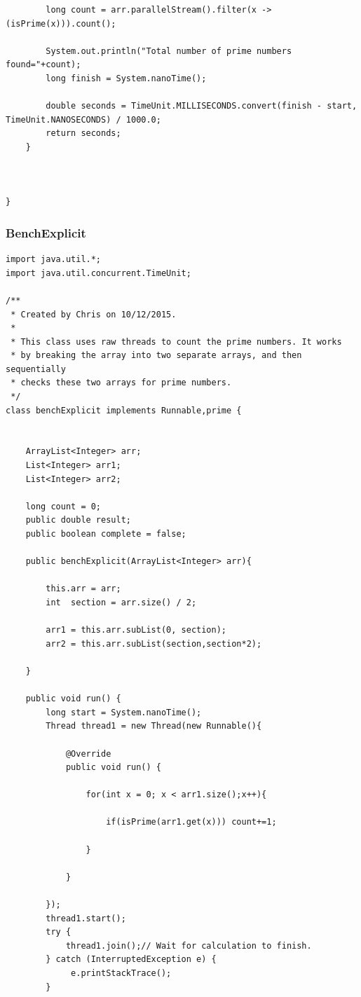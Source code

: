 \documentclass[10pt]{article}  %
\theoremstyle{definition}
\theoremstyle{remark}
\begin{document}
\begin{appendices}
\begin{lstlisting}
        long count = arr.parallelStream().filter(x -> (isPrime(x))).count();

        System.out.println("Total number of prime numbers found="+count);
        long finish = System.nanoTime();

        double seconds = TimeUnit.MILLISECONDS.convert(finish - start, TimeUnit.NANOSECONDS) / 1000.0;
        return seconds;
    }



}
\end{lstlisting}

\newpage
\subsubsection{BenchExplicit}\label{thread} 
  \begin{lstlisting}
import java.util.*;
import java.util.concurrent.TimeUnit;

/**
 * Created by Chris on 10/12/2015.
 *
 * This class uses raw threads to count the prime numbers. It works
 * by breaking the array into two separate arrays, and then sequentially
 * checks these two arrays for prime numbers.
 */
class benchExplicit implements Runnable,prime {


    ArrayList<Integer> arr;
    List<Integer> arr1;
    List<Integer> arr2;

    long count = 0;
    public double result;
    public boolean complete = false;

    public benchExplicit(ArrayList<Integer> arr){

        this.arr = arr;
        int  section = arr.size() / 2;

        arr1 = this.arr.subList(0, section);
        arr2 = this.arr.subList(section,section*2);

    }

    public void run() {
        long start = System.nanoTime();
        Thread thread1 = new Thread(new Runnable(){

            @Override
            public void run() {

                for(int x = 0; x < arr1.size();x++){

                    if(isPrime(arr1.get(x))) count+=1;

                }

            }

        });
        thread1.start();
        try {
            thread1.join();// Wait for calculation to finish.
        } catch (InterruptedException e) {
             e.printStackTrace();
        }


\end{lstlisting}
\end{appendices}
\end{document}
